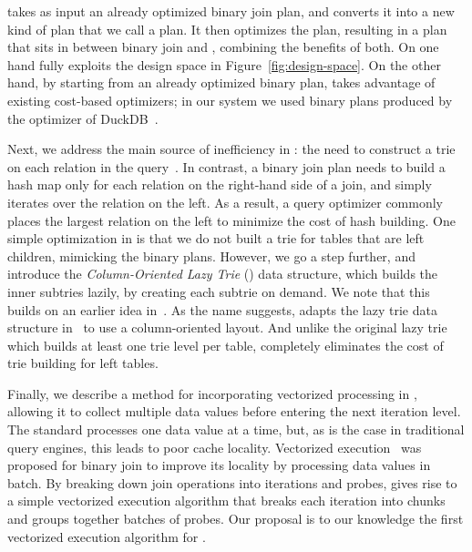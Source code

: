   \FJ takes as input an already optimized binary join plan, and
  converts it into a new kind of plan that we call a \FJ plan.  It
  then optimizes the \FJ plan, resulting in a plan that sits in
  between binary join and \GJ, combining the benefits of both.  On one
  hand \FJ fully exploits the design space in
  Figure~\ref{fig:design-space}.  On the other hand, by starting from
  an already optimized binary plan, \FJ takes advantage of existing
  cost-based optimizers; in our system we used binary plans produced by
  the optimizer of DuckDB~\cite{DBLP:conf/cidr/RaasveldtM20,DBLP:conf/vldb/Raasveldt22}.

Next, we address the main source of
  inefficiency in \GJ: the need to construct a trie on each relation
  in the query~\cite{DBLP:journals/pvldb/MhedhbiS19,DBLP:journals/pvldb/FreitagBSKN20}.  
In contrast,  a binary join plan needs to build a hash map only for each relation 
  on the right-hand side of a join,
  and simply iterates over the relation on the left.
As a result, a query optimizer commonly places the largest relation on the left
 to minimize the cost of hash building.
One simple optimization in \FJ is that we do not built a trie for
tables that are left children, mimicking the binary plans.
%
However, we go a step further, and introduce the {\em Column-Oriented
  Lazy Trie} (\COLT) data structure, which builds the inner subtries
  lazily, by creating each subtrie on demand.  
We note that this builds on an earlier idea
in~\cite{DBLP:journals/pvldb/FreitagBSKN20}.  As the name suggests,
\COLT adapts the lazy trie data structure
in~\cite{DBLP:journals/pvldb/FreitagBSKN20} to use a column-oriented
layout.  And unlike the original lazy trie which builds at least one
trie level per table, \COLT completely eliminates the cost of trie
building for left tables.


Finally, we describe a method for incorporating vectorized
  processing in \FJ, allowing it to collect multiple data values
  before entering the next iteration level.  
The standard \GJ processes one data value at a time, but, as is the
  case in traditional query engines, this leads to poor cache
  locality.  
Vectorized execution~\cite{DBLP:conf/icde/PadmanabhanAMJ01} was proposed for binary join
  to improve its locality by processing data values in batch.
By breaking down join operations into iterations and probes, 
  \FJ gives rise to a simple vectorized execution algorithm
  that breaks each iteration into chunks and groups together 
  batches of probes.
Our proposal is to our knowledge the first vectorized execution algorithm for \GJ.

